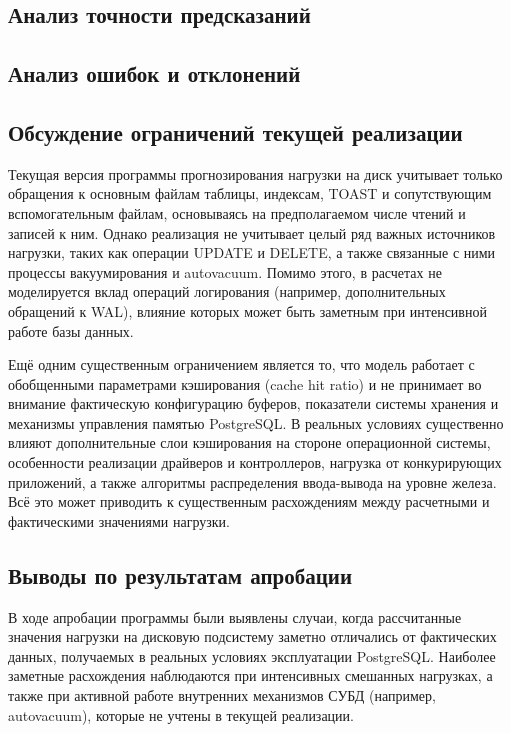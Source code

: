 \subsection{Анализ точности предсказаний}

\subsection{Анализ ошибок и отклонений}

\subsection{Обсуждение ограничений текущей реализации}

Текущая версия программы прогнозирования нагрузки на диск учитывает только обращения к основным файлам таблицы, 
индексам, TOAST и сопутствующим вспомогательным файлам, основываясь на предполагаемом числе чтений и записей к ним. 
Однако реализация не учитывает целый ряд важных источников нагрузки, таких как операции UPDATE и DELETE, 
а также связанные с ними процессы вакуумирования и autovacuum. Помимо этого, в расчетах не моделируется вклад 
операций логирования (например, дополнительных обращений к WAL), влияние которых может быть заметным при интенсивной 
работе базы данных.

Ещё одним существенным ограничением является то, что модель работает с обобщенными параметрами кэширования 
(cache hit ratio) и не принимает во внимание фактическую конфигурацию буферов, показатели системы хранения 
и механизмы управления памятью PostgreSQL. В реальных условиях существенно влияют дополнительные слои кэширования 
на стороне операционной системы, особенности реализации драйверов и контроллеров, нагрузка от конкурирующих приложений, 
а также алгоритмы распределения ввода-вывода на уровне железа. Всё это может приводить к существенным расхождениям 
между расчетными и фактическими значениями нагрузки.

\subsection{Выводы по результатам апробации}

В ходе апробации программы были выявлены случаи, когда рассчитанные значения нагрузки на дисковую подсистему заметно 
отличались от фактических данных, получаемых в реальных условиях эксплуатации PostgreSQL. Наиболее заметные расхождения 
наблюдаются при интенсивных смешанных нагрузках, а также при активной работе внутренних механизмов СУБД 
(например, autovacuum), которые не учтены в текущей реализации.

